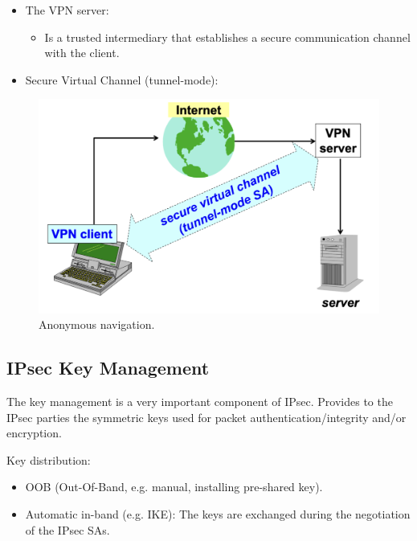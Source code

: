 \begin{multicols}{2}
    \raggedcolumns


    \begin{itemize}
        \item The VPN server:
        \begin{itemize}
            \item Is a trusted intermediary that establishes a secure communication channel with the client. 
        \end{itemize}
        \item Secure Virtual Channel (tunnel-mode):
    \end{itemize}
\columnbreak

    
\begin{figure}[H]
    \centering
  \includegraphics[width=\linewidth]{Images/NetSec/anonnav.png}
  \caption{Anonymous navigation.}
  \label{fig:anonnav}
\end{figure}

\end{multicols}

\subsection{IPsec Key Management}
The key management is a very important component of IPsec. Provides to the IPsec parties the symmetric keys used for packet authentication/integrity and/or encryption.

Key distribution:
\begin{itemize}
    \item OOB (Out-Of-Band, e.g. manual, installing pre-shared key).
    \item Automatic in-band (e.g. IKE): The keys are exchanged during the negotiation of the IPsec SAs.
\end{itemize}

